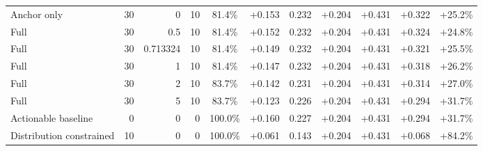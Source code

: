 \begin{table}[htbp]
\begin{tabular}{lrrrccccccc}
Anchor only & 30 & 0 & 10 & 81.4\% & +0.153 & 0.232 & +0.204 & +0.431 & +0.322 & +25.2\% \\
Full & 30 & 0.5 & 10 & 81.4\% & +0.152 & 0.232 & +0.204 & +0.431 & +0.324 & +24.8\% \\
Full & 30 & 0.713324 & 10 & 81.4\% & +0.149 & 0.232 & +0.204 & +0.431 & +0.321 & +25.5\% \\
Full & 30 & 1 & 10 & 81.4\% & +0.147 & 0.232 & +0.204 & +0.431 & +0.318 & +26.2\% \\
Full & 30 & 2 & 10 & 83.7\% & +0.142 & 0.231 & +0.204 & +0.431 & +0.314 & +27.0\% \\
Full & 30 & 5 & 10 & 83.7\% & +0.123 & 0.226 & +0.204 & +0.431 & +0.294 & +31.7\% \\
Actionable baseline & 0 & 0 & 0 & 100.0\% & +0.160 & 0.227 & +0.204 & +0.431 & +0.294 & +31.7\% \\
Distribution constrained & 10 & 0 & 0 & 100.0\% & +0.061 & 0.143 & +0.204 & +0.431 & +0.068 & +84.2\% \\
\bottomrule
\end{tabular}
\end{table}